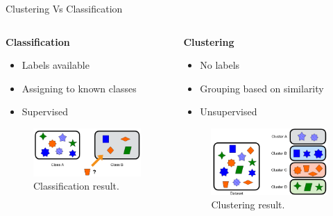\begin{frame}[allowframebreaks]{Clustering Vs Classification}
\begin{columns}
    \begin{column}{0.5\textwidth}
        \textbf{Classification}
        \begin{itemize}
            \item Labels available
            \item Assigning to known classes
            \item Supervised
        \end{itemize}
        \vspace{1.8em}
        \begin{figure}
            \centering
            \includegraphics[width=1\textwidth,keepaspectratio]{images/dul/sample-result-classification.png}
            \caption{Classification result.}
        \end{figure}
    \end{column}
    \begin{column}{0.5\textwidth}
        \textbf{Clustering}
        \begin{itemize}
            \item No labels
            \item Grouping based on similarity
            \item Unsupervised
        \end{itemize}
        \vspace{1.8em}
        \begin{figure}
            \centering
            \includegraphics[width=1\textwidth,keepaspectratio]{images/dul/sample-result-clustering.png}
            \caption{Clustering result.}
        \end{figure}
    \end{column}
\end{columns}
\end{frame}

